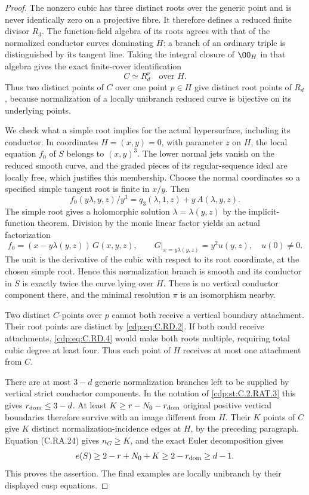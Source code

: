 \begin{proof}
The nonzero cubic has three distinct roots over the generic
point and is never identically zero on a projective fibre.
It therefore defines a reduced finite divisor $R_3$.
The function-field algebra of its roots agrees with that of
the normalized conductor curves dominating $H$: a branch
of an ordinary triple is distinguished by its tangent line.
Taking the integral closure of $\OO_H$ in that algebra gives
the exact finite-cover identification
\[
                            C\simeq R_d^\nu
                            \quad\text{over }H.
\tag{C.RD.2}\label{cdp:eq:C.RD.2}
\]
Thus two distinct points of $C$ over one point $p\in H$
give distinct root points of $R_d$, because normalization
of a locally unibranch reduced curve is bijective on its
underlying points.

We check what a simple root implies for the actual
hypersurface, including its conductor. In coordinates
$H=(x,y)=0$, with parameter $z$ on $H$, the local equation
$f_0$ of $S$ belongs to $(x,y)^3$. The lower normal jets
vanish on the reduced smooth curve, and the graded pieces
of its regular-sequence ideal are locally free, which
justifies this membership. Choose the normal coordinates
so a specified simple tangent root is finite in $x/y$.
Then
\[
 f_0(y\lambda,y,z)/y^3
       =q_3(\lambda,1,z)+y\,A(\lambda,y,z).
\tag{C.RD.3}\label{cdp:eq:C.RD.3}
\]
The simple root gives a holomorphic solution
$\lambda=\lambda(y,z)$ by the implicit-function theorem.
Division by the monic linear factor yields an actual
factorization
\[
 f_0=(x-y\lambda(y,z))\,G(x,y,z),\qquad
 G|_{x=y\lambda(y,z)}=y^2 u(y,z),\quad u(0)\ne0.
\tag{C.RD.4}\label{cdp:eq:C.RD.4}
\]
The unit is the derivative of the cubic with respect to
its root coordinate, at the chosen simple root. Hence
this normalization branch is smooth and its conductor
in $S$ is exactly twice the curve lying over $H$.
There is no vertical conductor component there, and
the minimal resolution $\pi$ is an isomorphism nearby.

Two distinct $C$-points over $p$ cannot both receive a
vertical boundary attachment. Their root points are
distinct by \eqref{cdp:eq:C.RD.2}. If both could receive attachments,
\eqref{cdp:eq:C.RD.4} would make both roots multiple, requiring total
cubic degree at least four. Thus each point of $H$
receives at most one attachment from $C$.

There are at most $3-d$ generic normalization branches
left to be supplied by vertical strict conductor
components. In the notation of \ref{cdp:st:C.2.RAT.3} this gives
$r_{\rm dom}\le3-d$. At least
$K\ge r-N_0-r_{\rm dom}$ original positive vertical
boundaries therefore survive with an image different
from $H$. Their $K$ points of $C$ give $K$ distinct
normalization-incidence edges at $H$, by the preceding
paragraph. Equation (C.RA.24) gives $n_G\ge K$, and
the exact Euler decomposition gives
\[
 e(S)\ge2-r+N_0+K
       \ge2-r_{\rm dom}\ge d-1.
\]
This proves the assertion. The final examples are locally
unibranch by their displayed cusp equations.
\end{proof}


